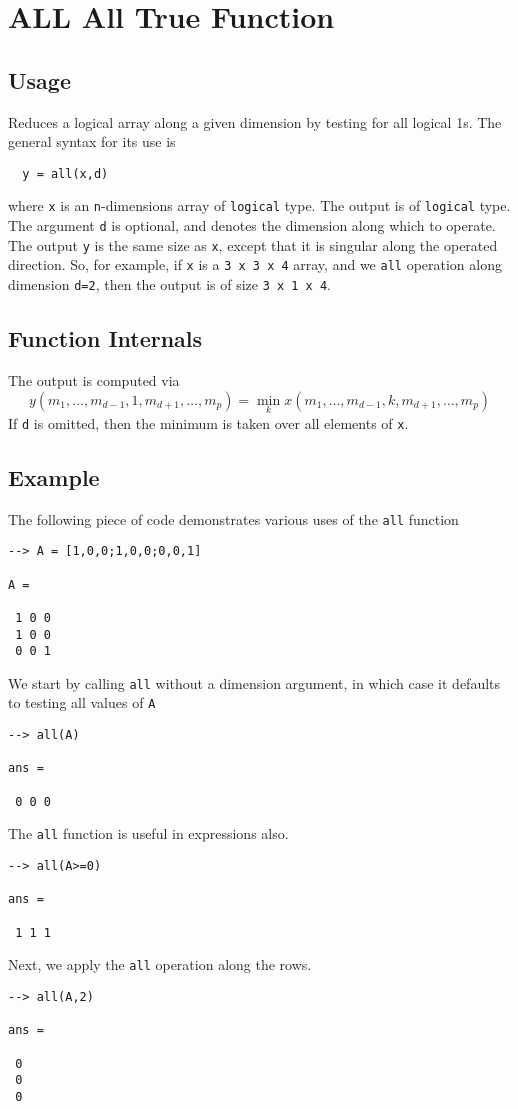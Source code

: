 \section{ALL All True Function}

\subsection{Usage}

Reduces a logical array along a given dimension by testing for all
logical 1s.  The general 
syntax for its use is
\begin{verbatim}
  y = all(x,d)
\end{verbatim}
where \verb|x| is an \verb|n|-dimensions array of \verb|logical| type.
The output is of \verb|logical| type.  The argument \verb|d| is 
optional, and denotes the dimension along which to operate.
The output \verb|y| is the same size as \verb|x|, except that it is 
singular along the operated direction.  So, for example,
if \verb|x| is a \verb|3 x 3 x 4| array, and we \verb|all| operation along
dimension \verb|d=2|, then the output is of size \verb|3 x 1 x 4|.
\subsection{Function Internals}

The output is computed via
\[
y(m_1,\ldots,m_{d-1},1,m_{d+1},\ldots,m_{p}) = 
\min_{k} x(m_1,\ldots,m_{d-1},k,m_{d+1},\ldots,m_{p})
\]
If \verb|d| is omitted, then the minimum is taken over all elements of
\verb|x|.
\subsection{Example}

The following piece of code demonstrates various uses of the \verb|all|
function
\begin{verbatim}
--> A = [1,0,0;1,0,0;0,0,1]

A = 

 1 0 0 
 1 0 0 
 0 0 1 
\end{verbatim}
We start by calling \verb|all| without a dimension argument, in which 
case it defaults to testing all values of \verb|A|
\begin{verbatim}
--> all(A)

ans = 

 0 0 0 
\end{verbatim}
The \verb|all| function is useful in expressions also.
\begin{verbatim}
--> all(A>=0)

ans = 

 1 1 1 
\end{verbatim}
Next, we apply the \verb|all| operation along the rows.
\begin{verbatim}
--> all(A,2)

ans = 

 0 
 0 
 0 
\end{verbatim}

